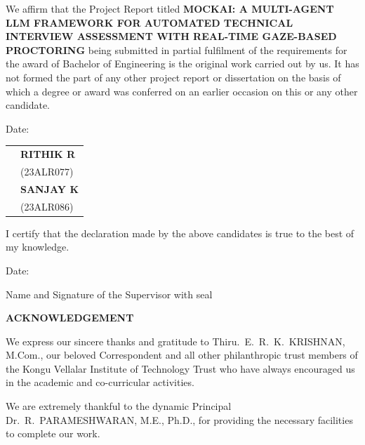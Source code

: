\documentclass[12pt,a4paper]{report}
\begin{document}
\vspace{0.8cm}
\noindent We affirm that the Project Report titled \textbf{MOCKAI: A MULTI-AGENT LLM
FRAMEWORK FOR AUTOMATED TECHNICAL INTERVIEW ASSESSMENT
WITH REAL-TIME GAZE-BASED PROCTORING} being submitted in partial
fulfilment of the requirements for the award of Bachelor of Engineering is the original
work carried out by us. It has not formed the part of any other project report or
dissertation on the basis of which a degree or award was conferred on an earlier occasion
on this or any other candidate.

\vspace{2.5cm}
\noindent Date:\underline{\hspace{3cm}}

\vspace{1cm}
\noindent\begin{tabular}{@{}p{7cm}@{}p{6cm}@{}}
& \textbf{RITHIK R}\\
& (23ALR077)\\[1.2cm]
& \textbf{SANJAY K}\\
& (23ALR086)
\end{tabular}

\vspace{1.2cm}
\noindent I certify that the declaration made by the above candidates is true to the best
of my knowledge.

\vspace{2cm}
\noindent Date:\underline{\hspace{3cm}}

\vspace{0.5cm}
\noindent Name and Signature of the Supervisor with seal

\clearpage
\thispagestyle{plain}
\begin{center}
{\large\bfseries ACKNOWLEDGEMENT}
\end{center}

\vspace{0.5cm}
\noindent We express our sincere thanks and gratitude to Thiru.\ E.\ R.\ K.\ KRISHNAN, M.Com.,
our beloved Correspondent and all other philanthropic trust members of the Kongu Vellalar
Institute of Technology Trust who have always encouraged us in the academic and
co-curricular activities.

\vspace{0.4cm}
\noindent We are extremely thankful to the dynamic Principal Dr.\ R.\ PARAMESHWARAN, M.E.,
Ph.D., for providing the necessary facilities to complete our work.
\end{document}
